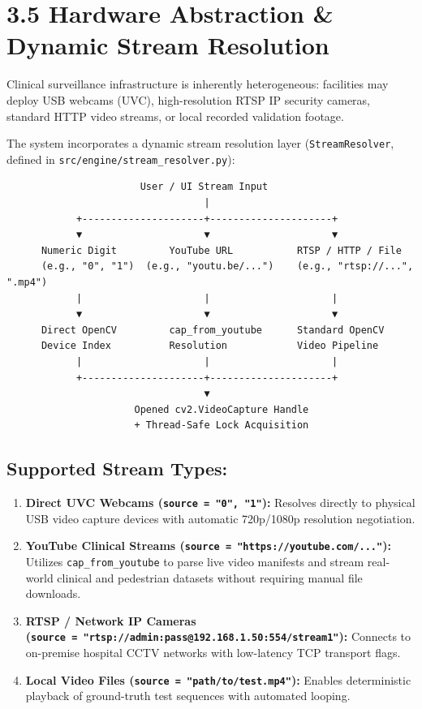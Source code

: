 \section{3.5 Hardware Abstraction \& Dynamic Stream
Resolution}\label{hardware-abstraction-dynamic-stream-resolution}

Clinical surveillance infrastructure is inherently heterogeneous:
facilities may deploy USB webcams (UVC), high-resolution RTSP IP
security cameras, standard HTTP video streams, or local recorded
validation footage.

The system incorporates a dynamic stream resolution layer
(\texttt{StreamResolver}, defined in
\texttt{src/engine/stream\_resolver.py}):

\begin{verbatim}
                       User / UI Stream Input
                                  |
            +---------------------+---------------------+
            ▼                     ▼                     ▼
      Numeric Digit         YouTube URL           RTSP / HTTP / File
      (e.g., "0", "1")  (e.g., "youtu.be/...")    (e.g., "rtsp://...", ".mp4")
            |                     |                     |
            ▼                     ▼                     ▼
      Direct OpenCV         cap_from_youtube      Standard OpenCV
      Device Index          Resolution            Video Pipeline
            |                     |                     |
            +---------------------+---------------------+
                                  ▼
                      Opened cv2.VideoCapture Handle
                      + Thread-Safe Lock Acquisition
\end{verbatim}

\subsection{Supported Stream Types:}\label{supported-stream-types}

\begin{enumerate}
\def\labelenumi{\arabic{enumi}.}
\tightlist
\item
  \textbf{Direct UVC Webcams (\texttt{source\ =\ "0",\ "1"}):} Resolves
  directly to physical USB video capture devices with automatic
  720p/1080p resolution negotiation.
\item
  \textbf{YouTube Clinical Streams
  (\texttt{source\ =\ "https://youtube.com/..."}):} Utilizes
  \texttt{cap\_from\_youtube} to parse live video manifests and stream
  real-world clinical and pedestrian datasets without requiring manual
  file downloads.
\item
  \textbf{RTSP / Network IP Cameras
  (\texttt{source\ =\ "rtsp://admin:pass@192.168.1.50:554/stream1"}):}
  Connects to on-premise hospital CCTV networks with low-latency TCP
  transport flags.
\item
  \textbf{Local Video Files (\texttt{source\ =\ "path/to/test.mp4"}):}
  Enables deterministic playback of ground-truth test sequences with
  automated looping.
\end{enumerate}

